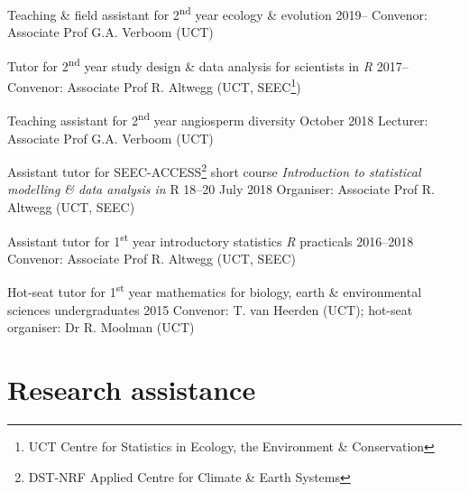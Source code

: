 \documentclass[10pt]{article}
\begin{document}
\begin{hangparas}{2em}{1}

Teaching \& field assistant for 2\textsuperscript{nd} year ecology \& evolution
                                                   \hfill {\small 2019--} \break
Convenor: Associate Prof G.A. Verboom (UCT)

Tutor for 2\textsuperscript{nd} year study design \& data analysis for 
scientists in \textit{R}                           \hfill {\small 2017--} \break
Convenor: Associate Prof R. Altwegg (UCT, SEEC\footnote{UCT Centre for 
Statistics in Ecology, the Environment \& Conservation})

Teaching assistant for 2\textsuperscript{nd} year angiosperm diversity
                                             \hfill {\small October 2018} \break
Lecturer: Associate Prof G.A. Verboom (UCT)

Assistant tutor for SEEC-ACCESS\footnote{DST-NRF Applied Centre for Climate \&
Earth Systems} short course \textit{Introduction to statistical modelling \&
data analysis in} R                      \hfill {\small 18--20 July 2018} \break
Organiser: Associate Prof R. Altwegg (UCT, SEEC)

Assistant tutor for 1\textsuperscript{st} year introductory statistics
\textit{R} practicals                          \hfill {\small 2016--2018} \break
Convenor: Associate Prof R. Altwegg (UCT, SEEC)

Hot-seat tutor for 1\textsuperscript{st} year mathematics for biology, earth \& 
environmental sciences undergraduates                \hfill {\small 2015} \break
Convenor: T. van Heerden (UCT); hot-seat organiser: Dr R. Moolman (UCT)

\hfill

\end{hangparas}

\clearpage

\section*{Research assistance} %
\end{document}
